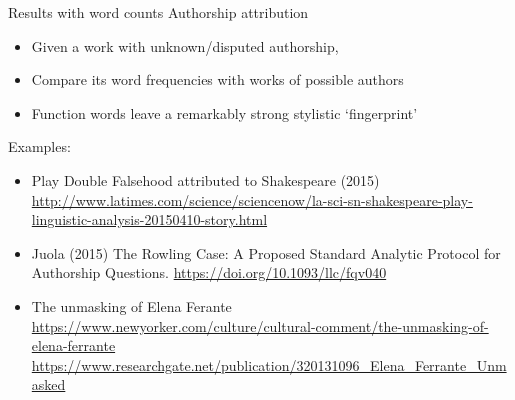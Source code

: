\documentclass[aspectratio=169,usenames,dvipsnames]{beamer}
\begin{document}
\begin{frame}{Results with word counts}
    Authorship attribution
    \begin{itemize}
        \item Given a work with unknown/disputed authorship,
        \item Compare its word frequencies with works of possible authors
        \item Function words leave a remarkably strong stylistic `fingerprint'
    \end{itemize}

    \pause
    Examples:
    \begin{itemize}
        \item Play Double Falsehood attributed to Shakespeare (2015) \\%
            {\small \url{http://www.latimes.com/science/sciencenow/la-sci-sn-shakespeare-play-linguistic-analysis-20150410-story.html}}

        \item Juola (2015) The Rowling Case: A Proposed Standard Analytic Protocol for Authorship Questions. %
            \url{https://doi.org/10.1093/llc/fqv040}
        \item The unmasking of Elena Ferante \\
            {\small \url{https://www.newyorker.com/culture/cultural-comment/the-unmasking-of-elena-ferrante}}
            \\
            {\small\url{https://www.researchgate.net/publication/320131096_Elena_Ferrante_Unmasked}}
    \end{itemize}
\end{frame}
\end{document}

